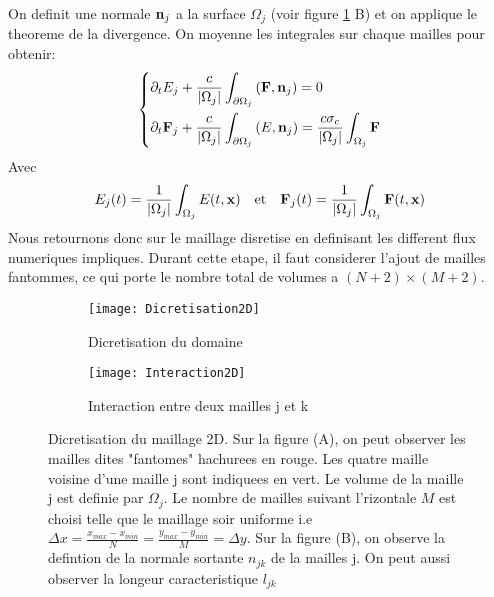 On definit une normale $\mathbf{n}_j$ a la surface $\Omega_j$ (voir figure \ref{fig:Discretisation2D} B) et on applique le theoreme de la divergence. On moyenne les integrales sur chaque mailles pour obtenir:
\begin{equation} 
    \begin{dcases}
    \partial_t E_j + \frac{c}{\left|\Omega_j\right|} \int_{\partial\Omega_j} \left( \mathbf{F}, \mathbf{n}_j  \right) = 0\\
    \partial_t \mathbf{F}_j + \frac{c}{\left|\Omega_j\right|} \int_{\partial\Omega_j} \left( E, \mathbf{n}_j  \right)= \frac{c \sigma_c}{\left|\Omega_j\right|} \int_{\Omega_j} \mathbf{F}
    \end{dcases}   
\label{eqn:VolFin}
\end{equation}
Avec $$ E_j(t) = \frac{1}{\left|\Omega_j\right|} \int_{\Omega_j} E(t,\mathbf{x}) \quad \text{et} \quad \mathbf{F}_j(t) = \frac{1}{\left|\Omega_j\right|} \int_{\Omega_j} \mathbf{F}(t,\mathbf{x}) $$
Nous retournons donc sur le maillage disretise en definisant les different flux numeriques impliques. Durant cette etape, il faut considerer l'ajout de mailles fantommes, ce qui porte le nombre total de volumes a $(N+2) \times (M+2)$.

\begin{figure}[H]
\begin{subfigure}{.6\textwidth}
  \centering
  \texttt{[image: Dicretisation2D]}  
  \caption{Dicretisation du domaine}
  \label{fig:Discretisation2D}
\end{subfigure}
\begin{subfigure}{.4\textwidth}
  \centering
  \texttt{[image: Interaction2D]}  
  \caption{Interaction entre deux mailles j et k}
  \label{fig:Interaction2D}
\end{subfigure}

\centering
\decoRule
\caption{Dicretisation du maillage 2D. Sur la figure (A), on peut observer les mailles dites "fantomes" hachurees en rouge. Les quatre maille voisine d'une maille j sont indiquees en vert. Le volume de la maille j est definie par $\Omega_j$. Le nombre de mailles suivant l'rizontale $M$ est choisi telle que le maillage soir uniforme i.e $\Delta x = \frac{x_{max}-x_{min}}{N} = \frac{y_{max}-y_{min}}{M} = \Delta y$. Sur la figure (B), on observe la defintion de la normale sortante $n_{jk}$ de la mailles j. On peut aussi observer la longeur caracteristique $l_{jk}$}
\label{fig:2DMesh}
\end{figure}

